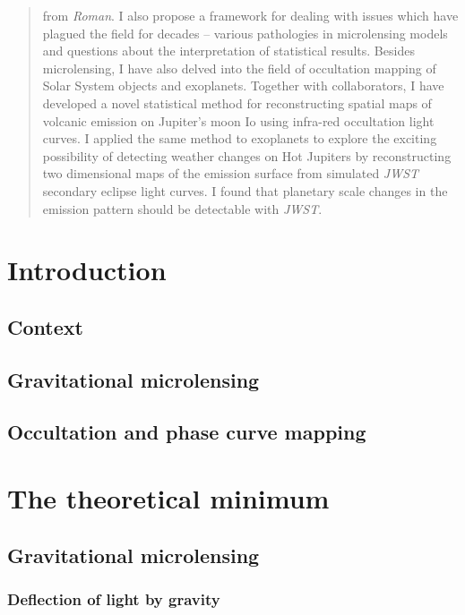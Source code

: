 \documentclass[]{report}
\begin{document}
\begin{abstract}
    from \emph{Roman}.
    I also propose a framework for dealing with issues which have plagued the field for
    decades -- various pathologies in microlensing models and questions about the interpretation
    of statistical results.
    Besides microlensing, I have also delved into the field of occultation mapping of Solar System
    objects and exoplanets.
    Together with collaborators, I have developed  a novel statistical method for reconstructing
    spatial maps of volcanic emission on Jupiter's moon Io using infra-red occultation
    light curves.
    I applied the same method to exoplanets to explore the exciting possibility of
    detecting weather changes on Hot Jupiters by reconstructing two dimensional maps of
    the emission surface from simulated \emph{JWST} secondary eclipse light curves.
    I found that planetary scale changes in the emission pattern should be detectable with
    \emph{JWST}.

\end{abstract}

\clearpage
\thispagestyle{empty}

\chapter{Introduction}
\section{Context}
\section{Gravitational microlensing}
\section{Occultation and phase curve mapping}

\chapter{The theoretical minimum}

\section{Gravitational microlensing}
\subsection{Deflection of light by gravity}
\end{document}
